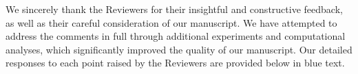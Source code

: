 We sincerely thank the Reviewers for their insightful and constructive feedback, as well as their careful consideration of our manuscript. We have attempted to address the comments in full through additional experiments and computational analyses, which significantly improved the quality of our manuscript. Our detailed responses to each point raised by the Reviewers are provided below in blue text.